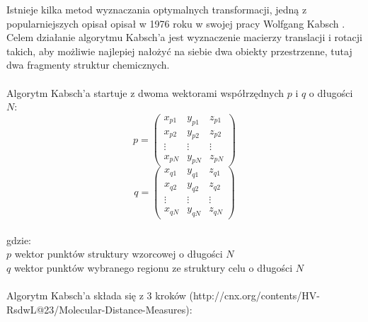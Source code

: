 \documentclass[licencjacka]{pracamgr}
\begin{document}
Istnieje kilka metod wyznaczania optymalnych transformacji, jedną z popularniejszych opisał opisał w 1976 roku w swojej pracy Wolfgang Kabsch \cite{kabsch1976}\cite{kabsch1978}. Celem działanie algorytmu Kabsch'a jest wyznaczenie macierzy translacji i rotacji takich, aby możliwie najlepiej nałożyć na siebie dwa obiekty przestrzenne, tutaj dwa fragmenty struktur chemicznych.
\\
\\
Algorytm Kabsch'a startuje z dwoma wektorami współrzędnych $p$ i $q$ o długości $N$:
$$
p=
\begin{pmatrix}
 x_{p1} & y_{p1} & z_{p1} \\
 x_{p2} & y_{p2} & z_{p2} \\
 \vdots & \vdots & \vdots \\
 x_{pN} & y_{pN} & z_{pN}
\end{pmatrix}
$$
$$
q= 
\begin{pmatrix}
 x_{q1} & y_{q1} & z_{q1} \\
 x_{q2} & y_{q2} & z_{q2} \\
 \vdots & \vdots & \vdots \\
 x_{qN} & y_{qN} & z_{qN}
\end{pmatrix}
$$
\\
gdzie:
\\
$p$ wektor punktów struktury wzorcowej o długości $N$
\\
$q$ wektor punktów wybranego regionu ze struktury celu o długości $N$
\\
\\
Algorytm Kabsch'a składa się z 3 kroków (http://cnx.org/contents/HV-RsdwL@23/Molecular-Distance-Measures):
\end{document}
